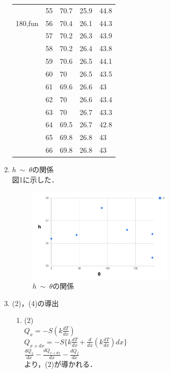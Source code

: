 \documentclass[twocolumn, 10pt,a4j]{jsarticle}
\begin{document}
\begin{enumerate}
\begin{table}[]
\begin{tabular}{lllll}
      &55&70.7&25.9&44.8  \\
      180,fun&56&70.4&26.1&44.3  \\
      &57&70.2&26.3&43.9  \\
      &58&70.2&26.4&43.8  \\
      &59&70.6&26.5&44.1  \\
      &60&70&26.5&43.5  \\
      &61&69.6&26.6&43  \\
      &62&70&26.6&43.4  \\
      &63&70&26.7&43.3  \\
      &64&69.5&26.7&42.8  \\
      &65&69.8&26.8&43  \\
      &66&69.8&26.8&43  \\
    \end{tabular}
  \end{table}






  \item $h\ \sim \ \theta$の関係 \\
    図1に示した．
    \begin{figure}[]
      \begin{center}
        \includegraphics[width=7cm]{../img/htheta.png}
        \caption{$h\ \sim \ \theta$の関係}
      \end{center}
    \end{figure}
  \item (2)，(4)の導出
    \begin{enumerate}
      \item (2) \\
        $Q_{x} = - S(k \frac{dT}{dx})$ \\
        $Q_{x+dx} = -S \{ k \frac{dT}{dx} + \frac{d}{dx} (k\frac{dT}{dx})dx     \}        $ \\
        $\frac{dQ_{x}}{dx} - \frac{dQ_{x+dx}}{dx} - \frac{dQ_{f}}{dx}$ \\
        より，(2)が導かれる．


\end{enumerate}
\end{enumerate}
\end{document}
